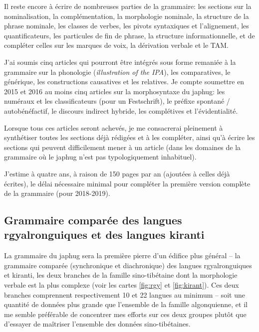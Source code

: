 \documentclass[oldfontcommands,oneside,a4paper,11pt]{article}
\begin{document}
Il reste encore à écrire de nombreuses parties de la grammaire: les sections sur la nominalisation, la complémentation, la morphologie nominale, la structure de la phrase nominale, les classes de verbes, les pivots syntaxiques et l'alignement, les quantificateurs, les particules de fin de phrase, la structure informationnelle, et de compléter celles sur les marques de voix, la dérivation verbale et le TAM.

  J'ai soumis cinq articles qui pourront être intégrés sous forme remaniée à la grammaire sur la phonologie (\textit{illustration of the IPA}), les comparatives, le générique, les constructions causatives et les relatives. Je compte soumettre en 2015 et 2016 au moins cinq articles sur la morphosyntaxe du japhug: les numéraux et les classificateurs (pour un Festschrift), le préfixe spontané / autobénéfactif, le discours indirect hybride, les complétives et l'évidentialité. 
  
  Lorsque tous ces articles seront achevés, je me consacrerai pleinement  à synthétiser toutes les sections déjà rédigées et à les compléter, ainsi qu'à écrire les sections qui peuvent difficilement mener à un article (dans les domaines de la grammaire où le japhug n'est pas typologiquement inhabituel).

J'estime à quatre ans, à raison de 150 pages par an (ajoutées à celles déjà écrites), le délai nécessaire minimal pour compléter la première version complète de la grammaire (pour 2018-2019).

\subsection{Grammaire comparée des langues rgyalronguiques et des langues kiranti}
La grammaire du japhug sera la première pierre d'un édifice plus général -- la grammaire comparée (synchronique et diachronique) des langues rgyalronguiques et kiranti, les deux branches de la famille sino-tibétaine dont la morphologie verbale est la plus complexe (voir les cartes  \ref{fig:rgy}  et \ref{fig:kirant}). Ces deux branches comprennent respectivement 10 et 22 langues au minimum -- soit une quantité de données plus grande que l'ensemble de la famille algonquienne, et il me semble préférable de concentrer mes efforts sur ces deux groupes plutôt que d'essayer de maîtriser l'ensemble des données sino-tibétaines.
\end{document}
